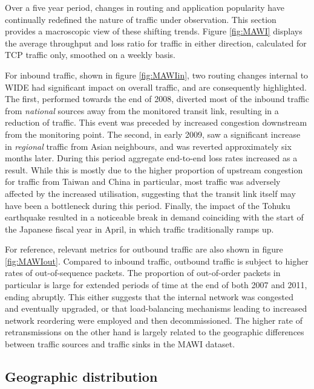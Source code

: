 Over a five year period, changes in routing and application popularity have continually redefined the nature of traffic under observation.
This section provides a macroscopic view of these shifting trends. 
Figure \ref{fig:MAWI} displays the average throughput and loss ratio for traffic in either direction, calculated for TCP traffic only, smoothed on a weekly basis. 

For inbound traffic, shown in figure \ref{fig:MAWIin}, two routing changes internal to WIDE had significant impact on overall traffic, and are consequently highlighted.
The first, performed towards the end of 2008, diverted most of the inbound traffic from \emph{national} sources away from the monitored transit link, resulting in a reduction of traffic.
This event was preceded by increased congestion downstream from the monitoring point.
The second, in early 2009, saw a significant increase in \emph{regional} traffic from Asian neighbours, and was reverted approximately six months later. 
During this period aggregate end-to-end loss rates increased as a result.
While this is mostly due to the higher proportion of upstream congestion for traffic from Taiwan and China in particular, most traffic was adversely affected by the increased utilisation, suggesting that the transit link itself may have been a bottleneck during this period.
Finally, the impact of the Tohuku earthquake resulted in a noticeable break in demand coinciding with the start of the Japanese fiscal year in April, in which traffic traditionally ramps up.

For reference, relevant metrics for outbound traffic are also shown in figure \ref{fig:MAWIout}.
Compared to inbound traffic, outbound traffic is subject to higher rates of out-of-sequence packets.
The proportion of out-of-order packets in particular is large for extended periods of time at the end of both 2007 and 2011, ending abruptly.
This either suggests that the internal network was congested and eventually upgraded, or that load-balancing mechanisms leading to increased network reordering were employed and then decommissioned.
The higher rate of retransmissions on the other hand is largely related to the geographic differences between traffic sources and traffic sinks in the \acs{MAWI} dataset.

\subsection{Geographic distribution}
\label{section:malawi:geo}

